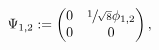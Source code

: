 \begin{equation}\label{eq:Psi}
 \Psi_{1,2}:=\begin{pmatrix} 0 & \sfrac{1}{\sqrt{8}}\phi_{1,2}\\
       0 & 0\end{pmatrix},
\end{equation}

